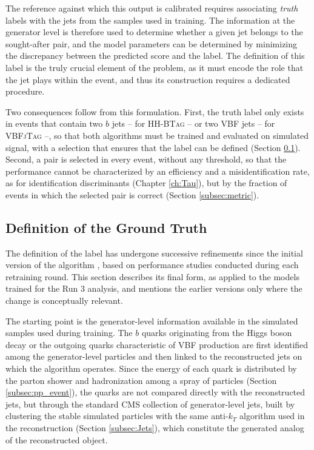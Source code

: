 The reference against which this output is calibrated requires associating \textit{truth} labels with the jets from the samples used in training. The information at the generator level is therefore used to determine whether a given jet belongs to the sought-after pair, and the model parameters can be determined by minimizing the discrepancy between the predicted score and the label. The definition of this label is the truly crucial element of the problem, as it must encode the role that the jet plays within the event, and thus its construction requires a dedicated procedure.\medskip

Two consequences follow from this formulation. First, the truth label only exists in events that contain two $b$ jets -- for \textsc{HH-BTag} -- or two VBF jets -- for \textsc{VBFjTag} --, so that both algorithms must be trained and evaluated on simulated signal, with a selection that ensures that the label can be defined (Section \ref{subsec:groundtruth}). Second, a pair is selected in every event, without any threshold, so that the performance cannot be characterized by an efficiency and a misidentification rate, as for identification discriminants (Chapter \ref{ch:Tau}), but by the fraction of events in which the selected pair is correct (Section \ref{subsec:metric}).

\subsection{Definition of the Ground Truth}
\label{subsec:groundtruth}
%
The definition of the label has undergone successive refinements since the initial version of the algorithm \textcolor{red}{\cite{CMS-HIG-20-010,HHBTag}}, based on performance studies conducted during each retraining round. This section describes its final form, as applied to the models trained for the Run 3 analysis, and mentions the earlier versions only where the change is conceptually relevant.

The starting point is the generator-level information available in the simulated samples used during training. The $b$ quarks originating from the Higgs boson decay or the outgoing quarks characteristic of VBF production are first identified among the generator-level particles and then linked to the reconstructed jets on which the algorithm operates. Since the energy of each quark is distributed by the parton shower and hadronization among a spray of particles (Section \ref{subsec:pp_event}), the quarks are not compared directly with the reconstructed jets, but through the standard CMS collection of generator-level jets, built by clustering the stable simulated particles with the same anti-$k_T$ algorithm used in the reconstruction (Section \ref{subsec:Jets}), which constitute the generated analog of the reconstructed object.


